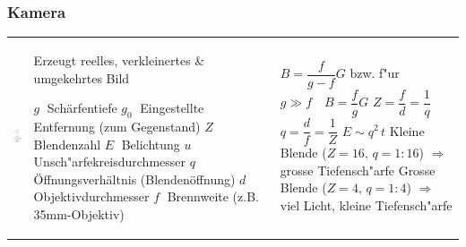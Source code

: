 \subsubsection{Kamera  }
\begin{tabular}{lll}
  \parbox{3cm}{
    \includegraphics[width=3cm]{./bilder/kamera.png}} &
  \parbox{7cm}{
    Erzeugt reelles, verkleinertes \& umgekehrtes Bild \\
    \\
    $g \;$ Schärfentiefe\\
    $g_0 \;$ Eingestellte Entfernung (zum Gegenstand)\\
    $Z \;$ Blendenzahl \\
    $E \;$ Belichtung \\
    $u \;$ Unsch"arfekreisdurchmesser \\
    $q \;$ Öffnungsverhältnis (Blendenöffnung) \\
    $d \;$ Objektivdurchmesser \\
    $f \;$ Brennweite (z.B. 35mm-Objektiv)} &
  \parbox{8cm}{
     \\
    $B=\dfrac{f}{g-f}G$ \qquad bzw. f"ur $g\gg f\quad B=\dfrac{f}{g}G$\\
    $Z = \dfrac{f}{d} = \dfrac1q$ \qquad $q = \dfrac{d}{f} = \dfrac1Z$\\
    $E\sim q^2\,t$ \\
    Kleine Blende ($Z=16, \,q=1:16$)\\ 
    $\Rightarrow$ grosse Tiefensch"arfe\\
    Grosse Blende ($Z=4,\,q=1:4$) \\ 
    $\Rightarrow$ viel Licht, kleine Tiefensch"arfe} \\
\end{tabular}

